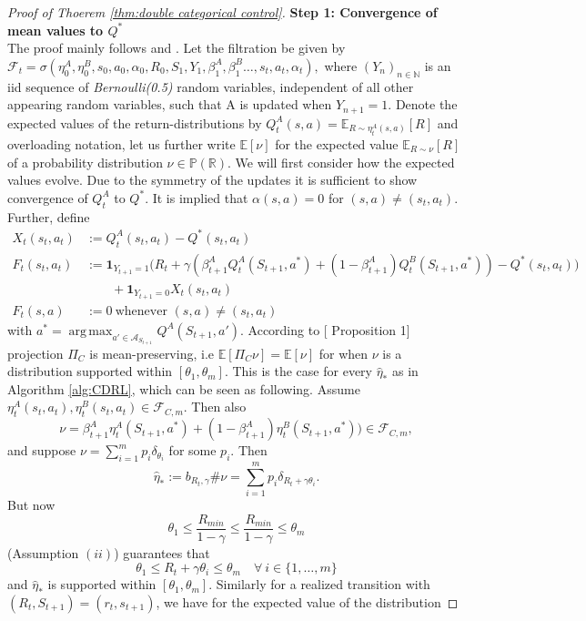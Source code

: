 \documentclass{article}
\newcommand{\cA}{\mathcal{A}}
\newcommand{\cF}{\mathcal{F}}
\newcommand{\cP}{\mathbb{P}}
\newcommand{\E}{\mathbb{E}}
\newcommand{\N}{\mathbb{N}}
\newcommand{\R}{\mathbb{R}}
\DeclareMathOperator{\argmax}{arg\,max}
\theoremstyle{plain}
\theoremstyle{definition}
\theoremstyle{remark}
\begin{document}
\begin{proof}[Proof of Thoerem \ref{thm:double categorical control}]
\textbf{Step 1: Convergence of mean values to $Q^*$}\\
The proof mainly follows \cite{rowland18} and \cite{hasselt2010}. Let the filtration be given by $\cF_t=\sigma(\eta^A_0,\eta^B_0,s_0,a_0,\alpha_0,R_0,S_1,Y_1,\beta^A_1,\beta^B_1\dots,s_t,a_t,\alpha_t),$ where $(Y_{n})_{n\in\N}$ is an iid sequence of \textit{Bernoulli(0.5)} random variables, independent of all other appearing random variables, such that A is updated when $Y_{n+1}=1$. Denote the expected values of the return-distributions by $Q^{A}_t(s,a)=\E_{R\sim\eta_t^A(s,a)}[R]$ and overloading notation, let us further write $\E[\nu]$ for the expected value $\E_{R\sim\nu}[R]$ of a probability distribution $\nu\in\cP(\R)$. We will first consider how the expected values evolve. Due to the symmetry of the updates it is sufficient to show convergence of $Q^A_t$ to $Q^*$. It is implied that $\alpha(s,a)=0$ for $(s,a)\neq(s_t,a_t)$.
Further, define
    \begin{align*}
        X_t(s_t,a_t) &:= Q^A_t(s_t,a_t)-Q^*(s_t,a_t)\\
        F_t(s_t,a_t) &:= \textbf{1}_{Y_{t+1}=1}\Big(R_t + \gamma(\beta^A_{t+1}Q_t^A(S_{t+1},a^*)+(1-\beta^A_{t+1})Q_t^B(S_{t+1},a^*)) -Q^*(s_t,a_t)\Big)\\
        &\mspace{36mu}+ \textbf{1}_{Y_{t+1}=0}X_t(s_t,a_t) \\
        F_t(s,a) &:= 0 \ \text{whenever } (s,a)\neq(s_t,a_t)
    \end{align*}
    with $a^*=\argmax_{a'\in\cA_{S_{t+1}}}Q^A(S_{t+1},a').$ According to [\cite{lyle19} Proposition 1] projection $\Pi_C$ is mean-preserving, i.e $\E[\Pi_C\nu]=\E[\nu]$ for when $\nu$ is a distribution supported within $[\theta_1,\theta_m]$. This is the case for every $\hat\eta_*$ as in Algorithm \ref{alg:CDRL}, which can be seen as following. Assume $\eta_t^A(s_t,a_t),\eta_t^B(s_t,a_t)\in\cF_{C,m}$. Then also 
    \[\nu= \beta^A_{t+1}\eta_t^A(S_{t+1},a^*)+(1-\beta^A_{t+1})\eta_t^B(S_{t+1},a^*))\in\cF_{C,m},\]
    and suppose $\nu=\sum_{i=1}^mp_i\delta_{\theta_i}$ for some $p_i$. Then
    \[\hat\eta_*:=b_{R_t,\gamma}\#\nu = \sum_{i=1}^mp_i\delta_{R_t+\gamma\theta_i}.\]
    But now
    \[\theta_1\leq \frac{R_{min}}{1-\gamma}\leq \frac{R_{min}}{1-\gamma}\leq \theta_m\]
    (Assumption $(ii)$) guarantees that
    \[\theta_1\leq R_t+\gamma\theta_i\leq \theta_m\quad \forall\ i\in\{1,\dots,m\}\]
    and $\hat\eta_*$ is supported within $[\theta_1,\theta_m]$.
    Similarly for a realized transition with $(R_t,S_{t+1})=(r_t,s_{t+1})$, we have for the expected value of the distribution

\end{proof}
\end{document}
